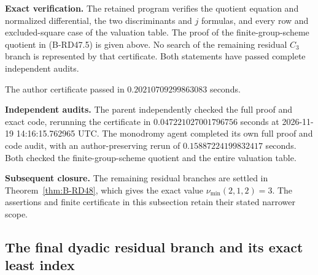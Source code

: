 \par\smallskip\noindent\textbf{Exact verification.}
The retained program
verifies the quotient equation and normalized differential,
the two discriminants and $j$ formulas, and every row and
excluded-square case of the valuation table. The proof of
the finite-group-scheme quotient in (B-RD47.5) is given
above. No search of the remaining residual $C_3$ branch is
represented by that certificate. Both statements have passed complete independent audits.

The author certificate passed in $0.20210709299863083$ seconds.

\par\smallskip\noindent\textbf{Independent audits.}
The parent independently checked the full proof and exact code,
rerunning the certificate in $0.047221027001796756$ seconds
at 2026-11-19 14:16:15.762965 UTC. The monodromy agent completed
its own full proof and code audit, with an author-preserving
rerun of $0.15887224199832417$ seconds. Both checked the
finite-group-scheme quotient and the entire valuation table.

\par\smallskip\noindent\textbf{Subsequent closure.}
The remaining residual branches are settled in
Theorem~\ref{thm:B-RD48}, which gives the exact value
$\nu_{\min}(2,1,2)=3$. The assertions and finite certificate
in this subsection retain their stated narrower scope.


\subsection{The final dyadic residual branch and its exact least index}


